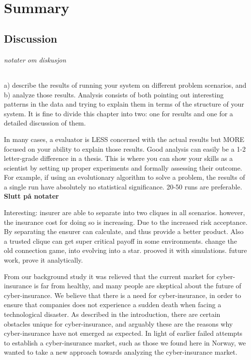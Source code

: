 \chapter{Summary}

\section{Discussion}
\subparagraph{notater om diskusjon}
 a) describe the results of running your system on different problem scenarios, and b) analyze those results. Analysis consists of both pointing out interesting patterns in the data and trying to explain them in terms of the structure of your system.
It is fine to divide this chapter into two: one for results and one for a detailed discussion of them.

In many cases, a evaluator is LESS concerned with the actual results but MORE focused on your ability to explain those results. Good analysis can easily be a 1-2 letter-grade difference in a thesis. This is where you can show your skills as a scientist by setting up proper experiments and formally assessing their outcome. For example, if using an evolutionary algorithm to solve a problem, the results of a single run have absolutely no statistical significance. 20-50 runs are preferable.
\textbf{Slutt på notater}

Interesting: insurer are able to separate into two cliques in all scenarios. however, the insurance cost for doing so is increasing. Due to the increased risk acceptance. 
By separating the ensurer can calculate, and thus provide a better product. Also a trusted clique can get super critical payoff in some environments. 
change the old connection game, into evolving into a star. prooved it with simulations. future work, prove it analytically.


From our background study it was relieved that the current market for cyber-insurance is far from healthy, and many people are skeptical about the future of cyber-insurance. We believe that there is a need for cyber-insurance, in order to ensure that companies does not experience a sudden death when facing a technological disaster. As described in the introduction, there are certain obstacles unique for cyber-insurance, and arguably these are the reasons why cyber-insurance have not emerged as expected. In light of earlier failed attempts to establish a cyber-insurance market, such as those we found here in Norway, we wanted to take a new approach towards analyzing the cyber-insurance market. 

